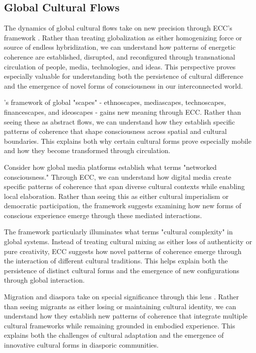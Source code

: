 \subsection{Global Cultural Flows}

The dynamics of global cultural flows take on new precision through ECC's framework \cite{appadurai1996modernity}. Rather than treating globalization as either homogenizing force or source of endless hybridization, we can understand how patterns of energetic coherence are established, disrupted, and reconfigured through transnational circulation of people, media, technologies, and ideas. This perspective proves especially valuable for understanding both the persistence of cultural difference and the emergence of novel forms of consciousness in our interconnected world.

\cite{appadurai1996modernity}'s framework of global "scapes" - ethnoscapes, mediascapes, technoscapes, financescapes, and ideoscapes - gains new meaning through ECC. Rather than seeing these as abstract flows, we can understand how they establish specific patterns of coherence that shape consciousness across spatial and cultural boundaries. This explains both why certain cultural forms prove especially mobile and how they become transformed through circulation.

Consider how global media platforms establish what \cite{castells2010rise} terms "networked consciousness." Through ECC, we can understand how digital media create specific patterns of coherence that span diverse cultural contexts while enabling local elaboration. Rather than seeing this as either cultural imperialism or democratic participation, the framework suggests examining how new forms of conscious experience emerge through these mediated interactions.

The framework particularly illuminates what \cite{hannerz1996transnational} terms "cultural complexity" in global systems. Instead of treating cultural mixing as either loss of authenticity or pure creativity, ECC suggests how novel patterns of coherence emerge through the interaction of different cultural traditions. This helps explain both the persistence of distinct cultural forms and the emergence of new configurations through global interaction.

Migration and diaspora take on special significance through this lens \cite{schiller1992transnational}. Rather than seeing migrants as either losing or maintaining cultural identity, we can understand how they establish new patterns of coherence that integrate multiple cultural frameworks while remaining grounded in embodied experience. This explains both the challenges of cultural adaptation and the emergence of innovative cultural forms in diasporic communities.


